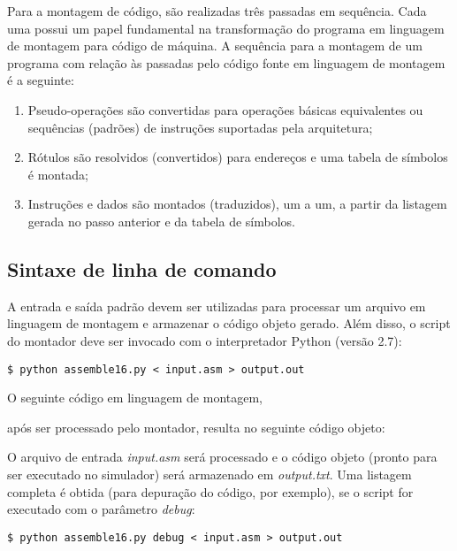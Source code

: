 \documentclass{extreport}
\begin{document}
Para a montagem de código, são realizadas três passadas em sequência. Cada uma possui um papel fundamental na transformação do programa em linguagem de montagem para código de máquina. A sequência para a montagem de um programa com relação às passadas pelo código fonte em linguagem de montagem é a seguinte:

\begin{enumerate}
\item Pseudo-operações são convertidas para operações básicas equivalentes ou sequências (padrões) de instruções suportadas pela arquitetura;
\item Rótulos são resolvidos (convertidos) para endereços e uma tabela de símbolos é montada;
\item Instruções e dados são montados (traduzidos), um a um, a partir da listagem gerada no passo anterior e da tabela de símbolos.
\end{enumerate}

\subsection{Sintaxe de linha de comando}

A entrada e saída padrão devem ser utilizadas para processar um arquivo em linguagem de montagem e armazenar o código objeto gerado. Além disso, o script do montador deve ser invocado com o interpretador Python (versão 2.7):

\begin{verbatim}
$ python assemble16.py < input.asm > output.out
\end{verbatim}

O seguinte código em linguagem de montagem,



após ser processado pelo montador, resulta no seguinte código objeto:



O arquivo de entrada \textit{input.asm} será processado e o código objeto (pronto para ser executado no simulador) será armazenado em \textit{output.txt}. Uma listagem completa é obtida (para depuração do código, por exemplo), se o script for executado com o parâmetro \textit{debug}:

\begin{verbatim}
$ python assemble16.py debug < input.asm > output.out
\end{verbatim}
\end{document}
